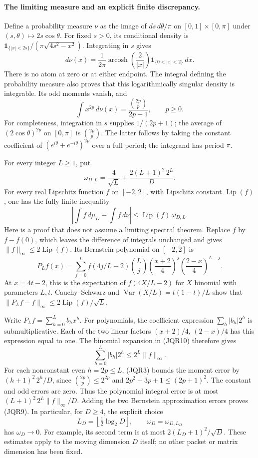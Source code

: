 \documentclass[11pt,a4paper]{article}
\begin{document}
\paragraph{The limiting measure and an explicit finite discrepancy.}
Define a probability measure \(\nu\) as the image of
\(ds\,d\theta/\pi\) on \([0,1]\times[0,\pi]\) under
\((s,\theta)\mapsto2s\cos\theta\).  For fixed \(s>0\), its conditional
density is
\(\mathbf1_{\{|x|<2s\}}/(\pi\sqrt{4s^2-x^2})\).
Integrating in \(s\) gives
\[
 d\nu(x)=
 \frac1{2\pi}\operatorname{arcosh}\!\left(\frac2{|x|}\right)
 \mathbf1_{\{0<|x|<2\}}\,dx.
 \tag{JQR6}
\]
There is no atom at zero or at either endpoint.  The integral defining
the probability measure also proves that this logarithmically singular
density is integrable.  Its odd moments vanish, and
\[
 \int x^{2p}\,d\nu(x)=\frac{\binom{2p}{p}}{2p+1},\qquad p\geq0.
 \tag{JQR7}
\]
For completeness, integration in \(s\) supplies \(1/(2p+1)\);
the average of \((2\cos\theta)^{2p}\) on \([0,\pi]\) is
\(\binom{2p}{p}\).  The latter follows by taking the constant coefficient
of \((e^{i\theta}+e^{-i\theta})^{2p}\) over a full period; the integrand
has period \(\pi\).

For every integer \(L\geq1\), put
\[
 \omega_{D,L}=\frac4{\sqrt L}
               +\frac{2(L+1)^2\,2^L}{D}.
 \tag{JQR8}
\]
For every real Lipschitz function \(f\) on \([-2,2]\), with Lipschitz
constant \(\operatorname{Lip}(f)\), one has the fully finite inequality
\[
 \left|\int f\,d\mu_D-\int f\,d\nu\right|
 \leq \operatorname{Lip}(f)\,\omega_{D,L}.
 \tag{JQR9}
\]
Here is a proof that does not assume a limiting spectral theorem.
Replace \(f\) by \(f-f(0)\), which leaves the difference of integrals
unchanged and gives \(\|f\|_\infty\leq2\operatorname{Lip}(f)\).
Its Bernstein polynomial on \([-2,2]\) is
\[
 P_Lf(x)=\sum_{j=0}^L f(4j/L-2)\binom Lj
       \left(\frac{x+2}{4}\right)^j
       \left(\frac{2-x}{4}\right)^{L-j}.
 \tag{JQR10}
\]
At \(x=4t-2\), this is the expectation of \(f(4X/L-2)\) for
\(X\) binomial with parameters \(L,t\).  Cauchy--Schwarz and
\(\operatorname{Var}(X/L)=t(1-t)/L\) show that
\(\|P_Lf-f\|_\infty\leq2\operatorname{Lip}(f)/\sqrt L\).

Write \(P_Lf=\sum_{h=0}^L b_hx^h\).
For polynomials, the coefficient expression
\(\sum_h|b_h|2^h\) is submultiplicative.  Each of the two linear factors
\((x+2)/4\), \((2-x)/4\) has this expression equal to one.
The binomial expansion in (JQR10) therefore gives
\[
 \sum_{h=0}^L|b_h|2^h\leq2^L\|f\|_\infty.
 \tag{JQR11}
\]
For each nonconstant even \(h=2p\leq L\), (JQR3) bounds the moment
error by \((h+1)^2\,2^h/D\), since
\(\binom{2p}{p}\leq2^{2p}\) and
\(2p^2+3p+1\leq(2p+1)^2\).  The constant and odd errors are zero.
Thus the polynomial integral error is at most
\((L+1)^2\,2^L\|f\|_\infty/D\).
Adding the two Bernstein approximation errors proves (JQR9).
In particular, for \(D\geq4\), the explicit choice
\[
 L_D=\left\lfloor\tfrac12\log_2D\right\rfloor,\qquad
 \omega_D=\omega_{D,L_D}
 \tag{JQR12}
\]
has \(\omega_D\to0\).  For example, its second term is at most
\(2(L_D+1)^2/\sqrt D\).  These estimates apply to the moving dimension
\(D\) itself; no other packet or matrix dimension has been fixed.
\end{document}
